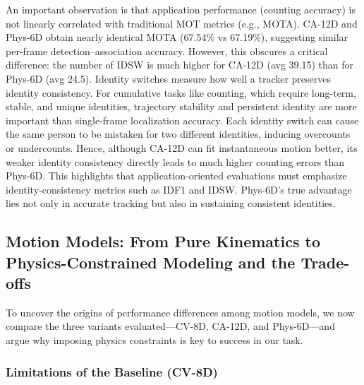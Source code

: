 An important observation is that application performance (counting accuracy) is not linearly correlated with traditional MOT metrics (e.g., MOTA). CA-12D and Phys-6D obtain nearly identical MOTA (67.54\% vs 67.19\%), suggesting similar per-frame detection–association accuracy. However, this obscures a critical difference: the number of IDSW is much higher for CA-12D (avg 39.15) than for Phys-6D (avg 24.5). Identity switches measure how well a tracker preserves identity consistency. For cumulative tasks like counting, which require long-term, stable, and unique identities, trajectory stability and persistent identity are more important than single-frame localization accuracy. Each identity switch can cause the same person to be mistaken for two different identities, inducing overcounts or undercounts. Hence, although CA-12D can fit instantaneous motion better, its weaker identity consistency directly leads to much higher counting errors than Phys-6D. This highlights that application-oriented evaluations must emphasize identity-consistency metrics such as IDF1 and IDSW. Phys-6D’s true advantage lies not only in accurate tracking but also in sustaining consistent identities.

\subsection{Motion Models: From Pure Kinematics to Physics-Constrained Modeling and the Trade-offs}

To uncover the origins of performance differences among motion models, we now compare the three variants evaluated—CV-8D, CA-12D, and Phys-6D—and argue why imposing physics constraints is key to success in our task.

\subsubsection{Limitations of the Baseline (CV-8D)}

